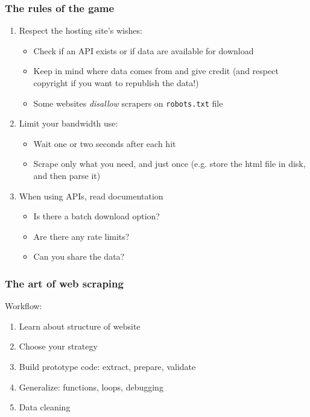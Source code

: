 \documentclass{beamer}
\begin{document}
\begin{frame}
	\frametitle{The rules of the game}
	
	\begin{enumerate}[<+->]
		\item Respect the hosting site's wishes:
		\begin{itemize}
			\item Check if an API exists or if data are available for download
			\item Keep in mind where data comes from and give credit (and respect copyright if you want to republish the data!)
			\item Some websites \textit{disallow} scrapers on \texttt{robots.txt} file
		\end{itemize}
		\vspace{.25cm}
		\item Limit your bandwidth use:
		\begin{itemize}
			\item Wait one or two seconds after each hit
			\item Scrape only what you need, and just once (e.g. store the html file in disk, and then parse it)
		\end{itemize}
		\vspace{.25cm}
		\item When using APIs, read documentation
		\begin{itemize}
			\item Is there a batch download option?
			\item Are there any rate limits?
			\item Can you share the data?
		\end{itemize}
	\end{enumerate}
\end{frame}

\begin{frame}
	\frametitle{The art of web scraping}
	
	Workflow:
	
	\begin{enumerate}[<+->]
		\item Learn about structure of website
		\item Choose your strategy
		\item Build prototype code: extract, prepare, validate
		\item Generalize: functions, loops, debugging
		\item Data cleaning
	\end{enumerate}
	
\end{frame}
\end{document}
